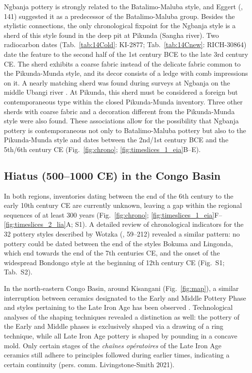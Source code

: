 \documentclass[smallextended,natbib]{svjour3}       %
\begin{document}
Ngbanja pottery is strongly related to the Batalimo-Maluba style, and Eggert (\citeyear{Eggert.1987a}, 141) suggested it as a predecessor of the Batalimo-Maluba group. Besides the stylistic connections, the only chronological fixpoint for the Ngbanja style is a sherd of this style found in the deep pit at Pikunda (Sangha river). Two radiocarbon dates (Tab.~\ref{tab:14Cold}: KI-2877; Tab.~\ref{tab:14Cnew}: RICH-30864) date the feature to the second half of the 1st century BCE to the late 3rd century CE. The sherd exhibits a coarse fabric instead of the delicate fabric common to the Pikunda-Munda style, and its decor consists of a ledge with comb impressions on it. A nearly matching sherd was found during surveys at Ngbanja on the middle Ubangi river \citep[83 Fig.~26.7--8]{Seidensticker.2021e}. At Pikunda, this sherd must be considered a foreign but contemporaneous type within the closed Pikunda-Munda inventory. Three other sherds with coarse fabric and a decoration different from the Pikunda-Munda style were also found. These associations allow for the possibility that Ngbanja pottery is contemporaneous not only to Batalimo-Maluba pottery but also to the Pikunda-Munda style and dates between the 2nd/1st century BCE and the 5th/6th century CE (Fig.~\ref{fig:chrono}; \ref{fig:timeslices_1_eia}B--E).

\subsection*{Hiatus (500--1000 CE) in the Congo Basin}

In both regions, inventories dating between the end of the 6th century to the early 10th century CE are currently unknown, leaving a gap within the regional sequences of at least 300 years (Fig.~\ref{fig:chrono}; \ref{fig:timeslices_1_eia}F--\ref{fig:timeslices_2_lia}A; S1). A detailed review of chronological indicators for the 32 pottery styles described by Wotzka (\citeyear{Wotzka.1995}, 59--212) revealed a similar pattern: no pottery could be dated between the end of the styles Bokuma and Lingonda, which end towards the end of the 7th centuries CE, and the onset of the widespread Bondongo style at the beginning of 12th century CE (Fig.~S1; Tab.~S2).

In the north-eastern Congo Basin, around Kisangani (Fig.~\ref{fig:map}), a similar interruption between ceramics designated to the Early and Middle Pottery Phase and styles pertaining to the Late Iron Age has been observed \citep[Fig.~\ref{fig:chrono}; S1]{LivingstoneSmith.2017}. Technological analyses of the shaping techniques revealed a distinction as well: the pottery of the Early and Middle phases is exclusively shaped via a drawing of a ring technique, while all Late Iron Age pottery is shaped by pounding in a concave mold. Only certain stages of the \textit{chaînes opératoires} of the Late Iron Age ceramics still adhere to principles followed during earlier times, indicating a certain continuity (pers. comm. Livingstone-Smith 2021).
\end{document}
